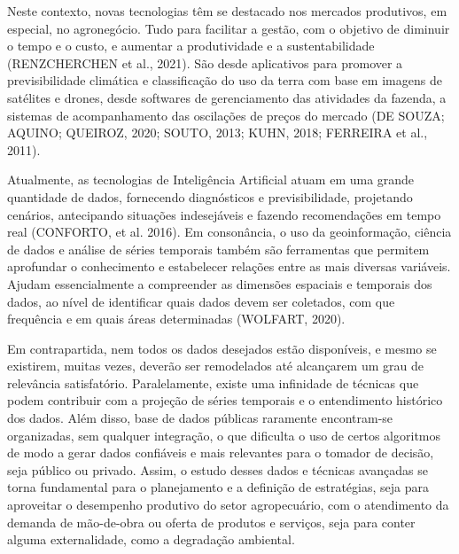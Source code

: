 Neste contexto, novas tecnologias têm se destacado nos mercados produtivos, em especial, no agronegócio. Tudo para facilitar a gestão, com o objetivo
de diminuir o tempo e o custo, e aumentar a produtividade e a sustentabilidade (RENZCHERCHEN et al., 2021). São desde aplicativos para promover a
previsibilidade climática e classificação do uso da terra com base em imagens de satélites e drones, desde softwares de gerenciamento das atividades da
fazenda, a sistemas de acompanhamento das oscilações de preços do mercado (DE SOUZA; AQUINO; QUEIROZ, 2020; SOUTO, 2013; KUHN, 2018;
FERREIRA et al., 2011).

Atualmente, as tecnologias de Inteligência Artificial atuam em uma grande quantidade de dados, fornecendo diagnósticos e previsibilidade, projetando
cenários, antecipando situações indesejáveis e fazendo recomendações em tempo real (CONFORTO, et al. 2016). Em consonância, o uso da geoinformação, ciência de dados e análise de séries temporais também são ferramentas que permitem aprofundar o conhecimento e estabelecer relações
entre as mais diversas variáveis. Ajudam essencialmente a compreender as dimensões espaciais e temporais dos dados, ao nível de identificar quais
dados devem ser coletados, com que frequência e em quais áreas determinadas (WOLFART, 2020).

Em contrapartida, nem todos os dados desejados estão disponíveis, e mesmo se existirem, muitas vezes, deverão ser remodelados até alcançarem um
grau de relevância satisfatório. Paralelamente, existe uma infinidade de técnicas que podem contribuir com a projeção de séries temporais e o
entendimento histórico dos dados. Além disso, base de dados públicas raramente encontram-se organizadas, sem qualquer integração, o que dificulta o
uso de certos algoritmos de modo a gerar dados confiáveis e mais relevantes para o tomador de decisão, seja público ou privado.
Assim, o estudo desses dados e técnicas avançadas se torna fundamental para o planejamento e a definição de estratégias, seja para aproveitar o desempenho produtivo do setor agropecuário, com o atendimento da demanda de mão-de-obra ou oferta de produtos e serviços, seja para conter alguma
externalidade, como a degradação ambiental.